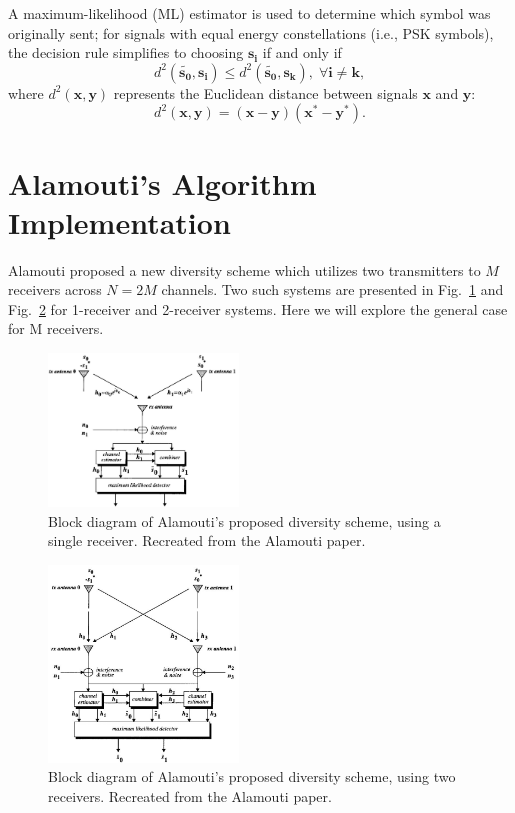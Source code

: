 \documentclass[journal]{IEEEtran}
\begin{document}
A maximum-likelihood (ML) estimator is used to determine which symbol was originally sent; for signals with equal energy constellations (i.e., PSK symbols), the decision rule simplifies to choosing $\pmb{s_i}$ if and only if
\begin{equation} \label{eq:ML_est}
d^2(\pmb{\tilde{s_0}}, \pmb{s_i}) \leq d^2(\pmb{\tilde{s_0}}, \pmb{s_k}), \; \forall \pmb{i}\neq\pmb{k},
\end{equation}
where $d^2(\pmb{x}, \pmb{y})$ represents the Euclidean distance between signals $\pmb{x}$ and $\pmb{y}$:
\begin{equation} \label{eq:euclid}
d^2(\pmb{x}, \pmb{y}) = (\pmb{x} - \pmb{y})(\pmb{x^*} - \pmb{y^*}).
\end{equation}

\section{Alamouti's Algorithm Implementation} \label{sec:alamouti}
Alamouti proposed a new diversity scheme which utilizes two transmitters to $M$ receivers across $N = 2M$ channels. Two such systems are presented in Fig.~\ref{fig:Alamouti_1_block} and Fig.~\ref{fig:Alamouti_2_block} for 1-receiver and 2-receiver systems. Here we will explore the general case for M receivers.
\begin{figure}
    \centering
    \includegraphics[width = 0.45\textwidth]{Alamouti-1}
    \caption{Block diagram of Alamouti's proposed diversity scheme, using a single receiver. Recreated from the Alamouti paper.}
    \label{fig:Alamouti_1_block}
\end{figure}
\begin{figure}
    \centering
    \includegraphics[width = 0.45\textwidth]{Alamouti-2}
    \caption{Block diagram of Alamouti's proposed diversity scheme, using two receivers. Recreated from the Alamouti paper.}
    \label{fig:Alamouti_2_block}
\end{figure}
\end{document}
